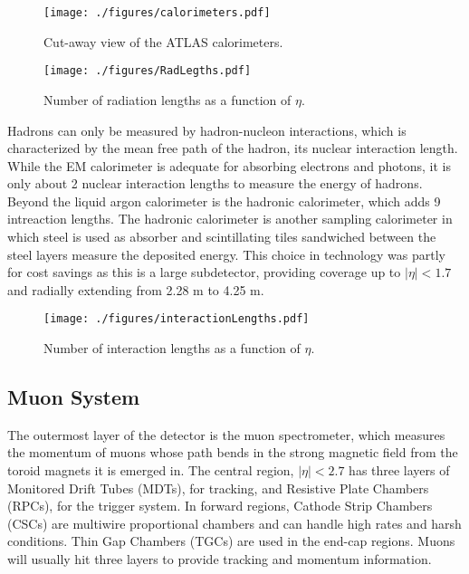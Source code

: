 \begin{figure}[h!]
  \centering
	\texttt{[image: ./figures/calorimeters.pdf]}
\caption{\label{fig:calorimeters}{ Cut-away view of the ATLAS calorimeters. }} %
\end{figure}

\begin{figure}[h!]
  \centering
	\texttt{[image: ./figures/RadLegths.pdf]}
\caption{\label{fig:radLengths}{ Number of radiation lengths as a function of $\eta$. }} %
\end{figure}


Hadrons can only be measured by hadron-nucleon interactions, which is characterized by the mean free path of the hadron, its nuclear interaction length.  While the EM calorimeter is adequate for absorbing electrons and photons, it is only about 2 nuclear interaction lengths to measure the energy of hadrons.  Beyond the liquid argon calorimeter is the hadronic calorimeter, which adds 9 intreaction lengths.  The hadronic calorimeter is another sampling calorimeter in which steel is used as absorber and scintillating tiles sandwiched between the steel layers measure the deposited energy.  This choice in technology was partly for cost savings as this is a large subdetector, providing coverage up to $|\eta|<1.7$ and radially extending from 2.28 m to 4.25 m.  \\

\begin{figure}[h!]
  \centering
	\texttt{[image: ./figures/interactionLengths.pdf]}
\caption{\label{fig:interactionLengths}{ Number of interaction lengths as a function of $\eta$. }} %
\end{figure}


\subsection{Muon System}

The outermost layer of the detector is the muon spectrometer, which measures the momentum of muons whose path bends in the strong magnetic field from the toroid magnets it is emerged in.  The central region, $|\eta|<2.7$ has three layers of Monitored Drift Tubes (MDTs), for tracking, and Resistive Plate Chambers (RPCs), for the trigger system.  In forward regions, Cathode Strip Chambers (CSCs) are multiwire proportional chambers and can handle high rates and harsh conditions.  Thin Gap Chambers (TGCs) are used in the end-cap regions.  Muons will usually hit three layers to provide tracking and momentum information.\\

